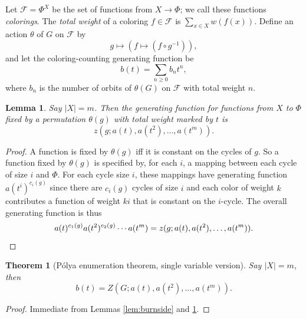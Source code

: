 \documentclass[12pt]{article}
\theoremstyle{plain}
\newtheorem{lem}{Lemma}
\newtheorem{thm}{Theorem}
\begin{document}
Let \( \mathcal{F} = \Phi^X \) be the set of functions from \( X \rightarrow \Phi \);
we call these functions \emph{colorings}.
The \emph{total weight} of a coloring \( f \in \mathcal{F} \) is \( \sum_{x \in X} w(f(x)) \).
Define an action \( \theta \) of \( G \) on \( \mathcal{F} \) by
\[ g \mapsto ( f \mapsto (f \circ g^{-1})), \]
and let the coloring-counting generating function be
\[ b(t) = \sum_{n \geq 0} b_n t^n, \]
where \( b_n \) is the number of orbits of \( \theta(G) \) on \( \mathcal{F} \) with total weight \( n \).



\begin{lem}
\label{lem:polya}
Say \(|X| = m \).
Then the generating function for functions from \(X\) to \( \Phi \) fixed by a permutation \( \theta(g) \) with total weight marked by \( t \) is
\[ z(g; a(t), a(t^2), \dots, a(t^m) ) . \]
\end{lem}
\begin{proof}
A function is fixed by \( \theta(g) \) iff it is constant on the cycles of \( g \).
So a function fixed by \( \theta(g) \) is specified by, for each \( i \), a mapping between each cycle of size \( i \) and \( \Phi \).
For each cycle size \( i \), these mappings have generating function \( a(t^i)^{c_i(g)} \) since there are \(c_i(g) \) cycles of size \( i \) and
each color of weight \( k \) contributes a function of weight \( ki \) that is constant on the \(i\)-cycle.
The overall generating function is thus
\[ a(t)^{c_1(g)} a(t^2)^{c_2(g)} \cdots a(t^m) = z(g; a(t), a(t^2), \dots, a(t^m) ). \qedhere \]
\end{proof}

\begin{thm}[P\'olya enumeration theorem, single variable version]
\label{page:polyatheorem}
\label{thm:polya}
Say \(|X| = m \), then
\[ b(t) = Z(G; a(t), a(t^2), \dots, a(t^m)). \]
\end{thm}
\begin{proof}
Immediate from Lemmas \ref{lem:burnside} and \ref{lem:polya}.
\end{proof}
\end{document}
